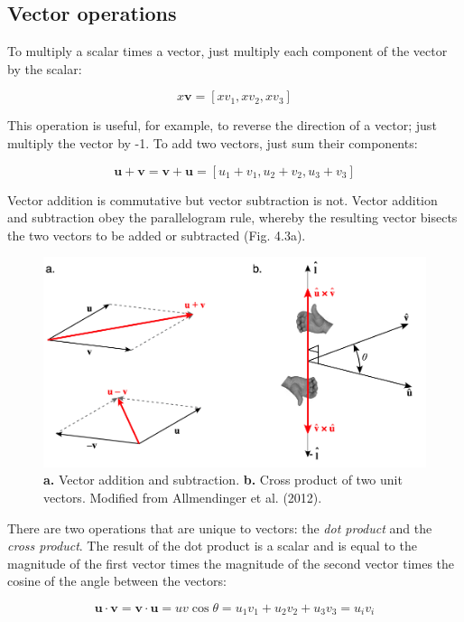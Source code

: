\documentclass[a4paper , 12pt]{book}
\begin{document}
\subsection{Vector operations}
To multiply a scalar times a vector, just multiply each component of the vector by the scalar:

\begin{equation}
    x\mathbf v=[xv_1,xv_2,xv_3]
\end{equation}

This operation is useful, for example, to reverse the direction of a vector; just multiply the vector by -1.
To add two vectors, just sum their components:

\begin{equation}
    \mathbf u + \mathbf v=\mathbf v+\mathbf u=[u_1+v_1,u_2+v_2,u_3+v_3]
\end{equation}

Vector addition is commutative but vector subtraction is not. Vector addition and subtraction obey the parallelogram rule, whereby the resulting vector bisects the two vectors to be added or subtracted (Fig. 4.3a).

\begin{figure}[ht]
    \centering
    \includegraphics[width=13cm]{ch4f3.pdf}
    \caption{\textbf{a.} Vector addition and subtraction. \textbf{b.} Cross product of two unit vectors. Modified from Allmendinger et al. (2012).}
\end{figure}

There are two operations that are unique to vectors: the \textit{dot product} and the \textit{cross product}. The result of the dot product is a scalar and is equal to the magnitude of the first vector times the magnitude of the second vector times the cosine of the angle between the vectors:

\begin{equation}
    \mathbf u \cdot\mathbf v=\mathbf v \cdot\mathbf u=uv\cos\theta=u_1v_1+u_2v_2+u_3v_3=u_iv_i
\end{equation}
\end{document}
